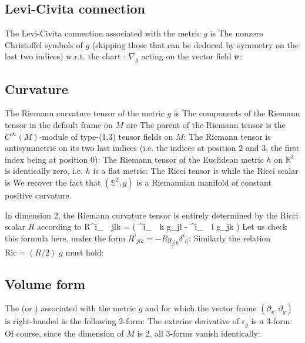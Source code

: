 \subsection{Levi-Civita connection}

The Levi-Civita connection associated with the metric $g$ is
The nonzero Christoffel symbols of $g$ (skipping those that can be deduced by symmetry on the last two indices) w.r.t. the chart :
$\nabla_g$ acting on the vector field $\bm{v}$:

\subsection{Curvature}

The Riemann curvature tensor of the metric $g$ is
The components of the Riemann tensor in the default frame on $M$ are
The parent of the Riemann tensor is the $C^\infty(M)$-module of
type-(1,3) tensor fields on $M$:
The Riemann tensor is antisymmetric on its two last indices (i.e. the indices
at position 2 and 3, the first index being at position 0):
The Riemann tensor of the Euclidean metric $h$ on $\mathbb{R}^3$ is identically zero,
i.e. $h$ is a flat metric:
The Ricci tensor is
while the Ricci scalar is
We recover the fact that $(\mathbb{S}^2,g)$ is a Riemannian manifold of constant positive curvature.

In dimension 2, the Riemann curvature tensor is entirely determined by the Ricci scalar $R$ according to
\be
 R^i_{\ \, jlk} =  \left( \delta^i_{\ \, k} g_{jl} - \delta^i_{\ \, l} g_{jk} \right)
\ee
Let us check this formula here, under the form
$R^i_{\ \, jlk} = -R g_{j[k} \delta^i_{\ \, l]}$:
Similarly the relation $\mathrm{Ric} = (R/2)\; g$ must hold:

\subsection{Volume form}

The  (or ) associated with the
metric $g$ and for which the vector frame $(\partial_x,\partial_y)$ is
right-handed is the following 2-form:
The exterior derivative of $\epsilon_g$ is a 3-form:
Of course, since the dimension of $M$ is 2, all 3-forms vanish identically:











